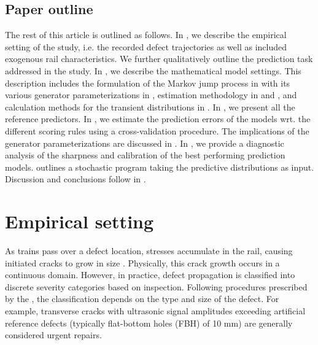 \documentclass{article}
\begin{document}
\subsection{Paper outline}
The rest of this article is outlined as follows. In , we describe the empirical setting of the study, i.e. the recorded defect trajectories as well as included exogenous rail characteristics. We further qualitatively outline the prediction task addressed in the study. In , we describe the mathematical model settings. This description includes the formulation of the Markov jump process in  with its various generator parameterizations in , estimation methodology in  and , and calculation methods for the transient distributions in . In , we present all the reference predictors. In , we estimate the prediction errors of the models wrt. the different scoring rules using a cross-validation procedure. The implications of the generator parameterizations are discussed in . In , we provide a diagnostic analysis of the sharpness and calibration of the best performing prediction models.  outlines a stochastic program taking the predictive distributions as input. Discussion and conclusions follow in . 


\section{Empirical setting} \label{sec:data}
As trains pass over a defect location, stresses accumulate in the rail, causing initiated cracks to grow in size \citep{cannon2003a}. Physically, this crack growth occurs in a continuous domain. However, in practice, defect propagation is classified into discrete severity categories based on inspection. Following procedures prescribed by the \citet{UIC_2002_defecthandbook}, the classification depends on the type and size of the defect. For example, transverse cracks with ultrasonic signal amplitudes exceeding artificial reference defects (typically flat-bottom holes (FBH) of 10 mm) are generally considered urgent repairs. 
\end{document}
